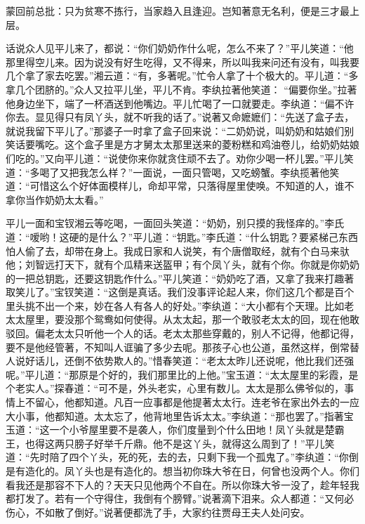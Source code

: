 
\begin{parag}

    \begin{note}蒙回前总批：只为贫寒不拣行，当家趋入且逢迎。岂知著意无名利，便是三才最上层。\end{note}
\end{parag}


\begin{parag}


    话说众人见平儿来了，都说：“你们奶奶作什么呢，怎么不来了？”平儿笑道：“他那里得空儿来。因为说没有好生吃得，又不得来，所以叫我来问还有没有，叫我要几个拿了家去吃罢。”湘云道：“有，多著呢。”忙令人拿了十个极大的。平儿道：“多拿几个团脐的。”众人又拉平儿坐，平儿不肯。李纨拉著他笑道： “偏要你坐。”拉著他身边坐下，端了一杯酒送到他嘴边。平儿忙喝了一口就要走。李纨道：“偏不许你去。显见得只有凤丫头，就不听我的话了。”说著又命嬷嬷们：“先送了盒子去，就说我留下平儿了。”那婆子一时拿了盒子回来说：“二奶奶说，叫奶奶和姑娘们别笑话要嘴吃。这个盒子里是方才舅太太那里送来的菱粉糕和鸡油卷儿，给奶奶姑娘们吃的。”又向平儿道：“说使你来你就贪住顽不去了。劝你少喝一杯儿罢。”平儿笑道：“多喝了又把我怎么样？”一面说，一面只管喝，又吃螃蟹。李纨揽著他笑道：“可惜这么个好体面模样儿，命却平常，只落得屋里使唤。不知道的人，谁不拿你当作奶奶太太看。”
\end{parag}


\begin{parag}


    平儿一面和宝钗湘云等吃喝，一面回头笑道：“奶奶，别只摸的我怪痒的。”李氏道：“嗳哟！这硬的是什么？”平儿道：“钥匙。”李氏道：“什么钥匙？要紧梯己东西怕人偷了去，却带在身上。我成日家和人说笑，有个唐僧取经，就有个白马来驮他；刘智远打天下，就有个瓜精来送盔甲；有个凤丫头，就有个你。你就是你奶奶的一把总钥匙，还要这钥匙作什么。”平儿笑道：“奶奶吃了酒，又拿了我来打趣著取笑儿了。”宝钗笑道：“这倒是真话。我们没事评论起人来，你们这几个都是百个里头挑不出一个来，妙在各人有各人的好处。”李纨道：“大小都有个天理。比如老太太屋里，要没那个鸳鸯如何使得。从太太起，那一个敢驳老太太的回，现在他敢驳回。偏老太太只听他一个人的话。老太太那些穿戴的，别人不记得，他都记得，要不是他经管著，不知叫人诓骗了多少去呢。那孩子心也公道，虽然这样，倒常替人说好话儿，还倒不依势欺人的。”惜春笑道：“老太太昨儿还说呢，他比我们还强呢。”平儿道：“那原是个好的，我们那里比的上他。”宝玉道：“太太屋里的彩霞，是个老实人。”探春道：“可不是，外头老实，心里有数儿。太太是那么佛爷似的，事情上不留心，他都知道。凡百一应事都是他提著太太行。连老爷在家出外去的一应大小事，他都知道。太太忘了，他背地里告诉太太。”李纨道：“那也罢了。”指著宝玉道：“这一个小爷屋里要不是袭人，你们度量到个什么田地！凤丫头就是楚霸王，也得这两只膀子好举千斤鼎。他不是这丫头，就得这么周到了！”平儿笑道：“先时陪了四个丫头，死的死，去的去，只剩下我一个孤鬼了。”李纨道：“你倒是有造化的。凤丫头也是有造化的。想当初你珠大爷在日，何曾也没两个人。你们看我还是那容不下人的？天天只见他两个不自在。所以你珠大爷一没了，趁年轻我都打发了。若有一个守得住，我倒有个膀臂。”说著滴下泪来。众人都道：“又何必伤心，不如散了倒好。”说著便都洗了手，大家约往贾母王夫人处问安。
\end{parag}



